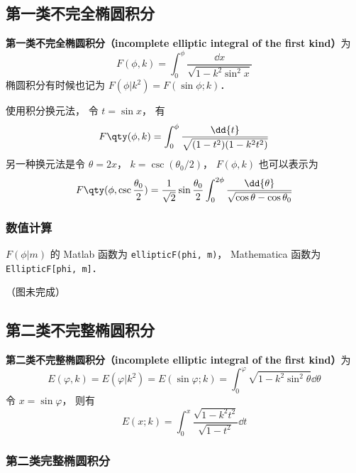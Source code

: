 

\subsection{第一类不完全椭圆积分}
\textbf{第一类不完全椭圆积分（incomplete elliptic integral of the first kind）}为
\begin{equation}\label{EliInt_eq1}
F(\phi, k) = \int_0^\phi \frac{\dd{x}}{\sqrt{1 - k^2\sin^2 x}}
\end{equation}
椭圆积分有时候也记为 $F(\phi | k^2) = F(\sin\phi ; k)$．

使用积分换元法， 令 $t = \sin x$， 有
\begin{equation}
F\qty(\phi, k) = \int_0^\phi \frac{\dd{t}}{\sqrt{(1 - t^2)(1 - k^2 t^2)}}
\end{equation}
另一种换元法是令 $\theta = 2x$， $k = \csc(\theta_0/2)$， $F(\phi, k)$ 也可以表示为
\begin{equation}\label{EliInt_eq2}
F\qty(\phi, \csc\frac{\theta_0}{2}) = \frac{1}{\sqrt{2}} \sin\frac{\theta_0}{2} \int_0^{2\phi} \frac{\dd{\theta}}{\sqrt{\cos\theta - \cos\theta_0}}
\end{equation}

\subsubsection{数值计算}
$F(\phi | m)$ 的 Matlab 函数为 \verb|ellipticF(phi, m)|， %
Mathematica 函数为 \verb|EllipticF[phi, m]|．

（图未完成）

\subsection{第二类不完整椭圆积分}
\textbf{第二类不完整椭圆积分（incomplete elliptic integral of the first kind）}为
\begin{equation}
E(\varphi, k) = E(\varphi | k^2) = E(\sin\varphi; k) = \int_0^\varphi \sqrt{1 - k^2\sin^2\theta} \dd{\theta}
\end{equation}
令 $x = \sin\varphi$， 则有
\begin{equation}
E(x; k) = \int_0^x \frac{\sqrt{1 - k^2t^2}}{\sqrt{1 - t^2}}\dd{t}
\end{equation}



\subsubsection{第二类完整椭圆积分}

